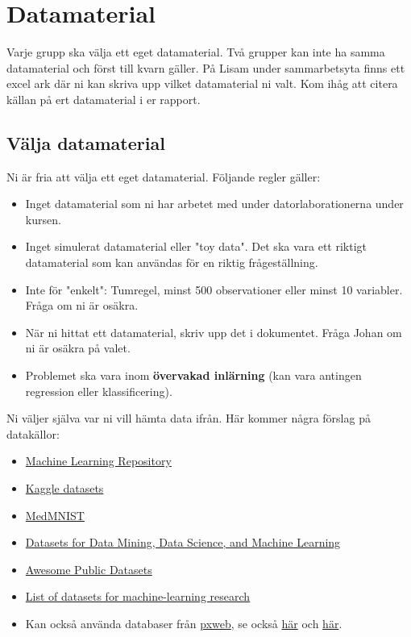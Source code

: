 \documentclass[a4paper]{article}
\begin{document}
\section{Datamaterial} \label{sec:data}
Varje grupp ska välja ett eget datamaterial. Två grupper kan inte ha samma datamaterial och först till kvarn gäller. På Lisam under sammarbetsyta finns ett excel ark där ni kan skriva upp vilket datamaterial ni valt. Kom ihåg att citera källan på ert datamaterial i er rapport.

\subsection*{Välja datamaterial}
Ni är fria att välja ett eget datamaterial. Följande regler gäller:
\begin{itemize}
    \item Inget datamaterial som ni har arbetet med under datorlaborationerna under kursen.
    \item Inget simulerat datamaterial eller "toy data". Det ska vara ett riktigt datamaterial som kan användas för en riktig frågeställning.
    \item Inte för "enkelt": Tumregel, minst 500 observationer eller minst 10 variabler. Fråga om ni är osäkra.
    \item När ni hittat ett datamaterial, skriv upp det i dokumentet. Fråga Johan om ni är osäkra på valet.
    \item Problemet ska vara inom \textbf{övervakad inlärning} (kan vara antingen regression eller klassificering).
\end{itemize}
Ni väljer själva var ni vill hämta data ifrån. Här kommer några förslag på datakällor:
\begin{itemize}
    \item \href{https://archive.ics.uci.edu/ml/index.php}{Machine Learning Repository}
    \item \href{https://www.kaggle.com/datasets}{Kaggle datasets}
    \item \href{https://medmnist.com/}{MedMNIST}
    \item \href{https://www.kdnuggets.com/datasets/index.html}{Datasets for Data Mining, Data Science, and Machine Learning}
    \item \href{https://github.com/awesomedata/awesome-public-datasets}{Awesome Public Datasets}
    \item \href{https://en.wikipedia.org/wiki/List_of_datasets_for_machine-learning_research}{List of datasets for machine-learning research}
    \item Kan också använda databaser från \href{https://cran.r-project.org/web/packages/pxweb/index.html}{pxweb}, se också \href{https://cran.r-project.org/web/packages/pxweb/vignettes/pxweb.html}{här} och \href{https://www.scb.se/en/services/statistical-programs-for-px-files/px-web/pxweb-examples/}{här}.
\end{itemize}
\end{document}
